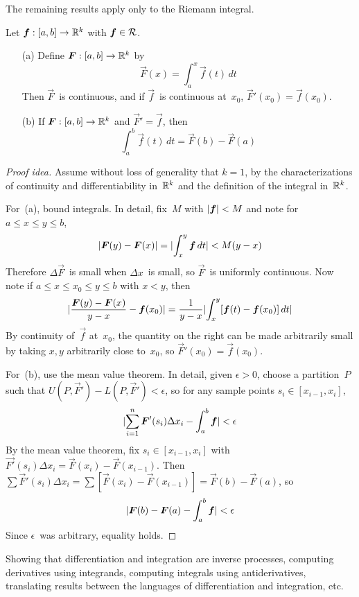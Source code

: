 \noindent The remaining results apply only to the Riemann integral.

\begin{thm}
Let \(\boldsymbol{f}:[a,b]\to\mathbb{R}^k\) with \(\boldsymbol{f}\in\mathcal{R}\).
\begin{enumerate}[itemsep=0pt]
\item[(a)] Define \(\boldsymbol{F}:[a,b]\to\mathbb{R}^k\) by
\[\vec{F}(x)=\int_a^x\vec{f}(t)\,dt\]
Then \(\vec{F}\)~is continuous, and if \(\vec{f}\)~is continuous at~\(x_0\), \(\vec{F}'(x_0)=\vec{f}(x_0)\).
\item[(b)] If \(\boldsymbol{F}:[a,b]\to\mathbb{R}^k\) and \(\vec{F}'=\vec{f}\), then
\[\int_a^b\vec{f}(t)\,dt=\vec{F}(b)-\vec{F}(a)\]
\end{enumerate}
\end{thm}
\begin{proof}[Proof idea]
Assume without loss of generality that \(k=1\), by the characterizations of continuity and differentiability in~\(\mathbb{R}^k\) and the definition of the integral in~\(\mathbb{R}^k\).

For~(a), bound integrals. In detail, fix~\(M\) with \(|{\boldsymbol{f}}|<M\) and note for \(a\le x\le y\le b\),
\[|{\boldsymbol{F}(y)-\boldsymbol{F}(x)}|=|{\int_x^y\boldsymbol{f}\,dt}|<M(y-x)\]
Therefore \(\Delta\vec{F}\)~is small when \(\Delta x\)~is small, so \(\vec{F}\)~is uniformly continuous. Now note if \(a\le x\le x_0\le y\le b\) with \(x<y\), then
\[|{\frac{\boldsymbol{F}(y)-\boldsymbol{F}(x)}{y-x}-\boldsymbol{f}(x_0)}|=\frac{1}{y-x}|{\int_x^y[\boldsymbol{f}(t)-\boldsymbol{f}(x_0)]\,dt}|\]
By continuity of~\(\vec{f}\) at~\(x_0\), the quantity on the right can be made arbitrarily small by taking \(x,y\) arbitrarily close to~\(x_0\), so \(\vec{F}'(x_0)=\vec{f}(x_0)\).

For~(b), use the mean value theorem. In detail, given \(\epsilon>0\), choose a partition~\(P\) such that \(U(P,\vec{F}')-L(P,\vec{F}')<\epsilon\), so for any sample points \(s_i\in[x_{i-1},x_i]\),
\[|{\sum_{i=1}^n\boldsymbol{F}'(s_i)\Delta x_i-\int_a^b\boldsymbol{f}}|<\epsilon\]
By the mean value theorem, fix \(s_i\in[x_{i-1},x_i]\) with \(\vec{F'}(s_i)\Delta x_i=\vec{F}(x_i)-\vec{F}(x_{i-1})\). Then \(\sum\vec{F}'(s_i)\Delta x_i=\sum[\vec{F}(x_i)-\vec{F}(x_{i-1})]=\vec{F}(b)-\vec{F}(a)\), so
\[|{\boldsymbol{F}(b)-\boldsymbol{F}(a)-\int_a^b\boldsymbol{f}}|<\epsilon\]
Since \(\epsilon\)~was arbitrary, equality holds.
\end{proof}
\begin{app}
Showing that differentiation and integration are inverse processes, computing derivatives using integrands, computing integrals using antiderivatives, translating results between the languages of differentiation and integration, etc.
\end{app}

